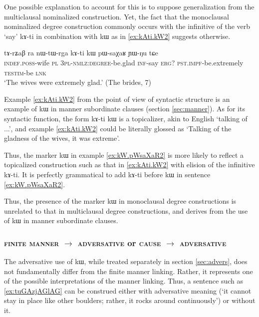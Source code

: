 \documentclass[oldfontcommands,oneside,a4paper,11pt]{article}
\newcommand{\ipa}[1]{{\phon #1}} %
\begin{document}
One possible explanation to account for this is to suppose generalization from the multiclausal nominalized construction. Yet, the fact that the monoclausal nominalized degree construction commonly occurs with the infinitive of the verb `say' \ipa{kɤ-ti} in combination with   \ipa{kɯ} as in \ref{ex:kAti.kW2}  suggests otherwise.
      \begin{exe}
  \ex  \label{ex:kAti.kW2}  
  \gll 
\ipa{tɤ-rʑaβ} 	\ipa{ra} 	 	\ipa{nɯ-tɯ-rga} 	\ipa{kɤ-ti} 	\ipa{kɯ} 	\ipa{pɯ-saχaʁ} 	\ipa{ɲɯ-ŋu} 	\ipa{tɕe} \\
\textsc{indef.poss}-wife \textsc{pl} \textsc{3pl-nmlz:degree}-be.glad \textsc{inf}-say \textsc{erg?} \textsc{pst.impf}-be.extremely \textsc{testim}-be \textsc{lnk} \\
\glt `The wives were extremely glad.' (The brides, 7)
   \end{exe} 
   
Example \ref{ex:kAti.kW2}  from the point of view of syntactic structure is an example of \ipa{kɯ} in manner subordinate clauses (section \ref{sec:manner}). As for its syntactic function, the form \ipa{kɤ-ti kɯ} is a topicalizer, akin to English  `talking of ...', and example \ref{ex:kAti.kW2}  could be literally glossed as `Talking of the gladness of the wives, it was extreme'. 
 
Thus, the marker \ipa{kɯ} in example \ref{ex:kW.pWsaXaR2}  is more likely to reflect a topicalized construction such as that in \ref{ex:kAti.kW2}  with elision of the infinitive \ipa{kɤ-ti}. It is perfectly grammatical to add \ipa{kɤ-ti} before \ipa{kɯ} in sentence \ref{ex:kW.pWsaXaR2}. 

Thus, the presence of the marker \ipa{kɯ} in monoclausal degree constructions is unrelated to that in multiclausal degree constructions, and derives from the use of \ipa{kɯ} in manner subordinate clauses. 


 \subsubsection{\textsc{finite manner} $\rightarrow$ \textsc{adversative} or \textsc{cause} $\rightarrow$ \textsc{adversative} }
 
The adversative use of \ipa{kɯ}, while treated separately  in section \ref{sec:advers}, does not fundamentally  differ from the finite manner linking. Rather, it represents one of the possible interpretations of the manner linking. Thus, a sentence such as  \ref{ex:tuGAzjAGlAG} can be construed either with adversative meaning (`it cannot stay in place like other boulders; rather, it rocks around continuously') or without it.
 
\end{document}
